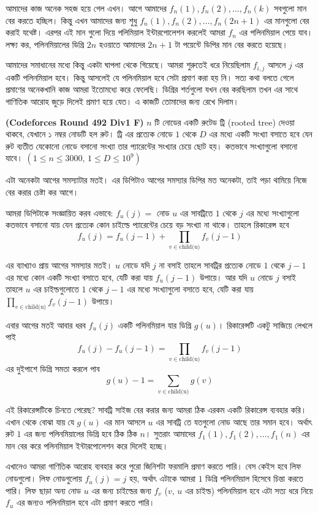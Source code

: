 \begin{solution}
আমাদের কাজ অনেক সহজ হয়ে গেল এখন। আগে আমাদের $f_{n}(1), f_{n}(2), \dots, f_{n}(k)$ সবগুলো মান বের করতে হচ্ছিল। কিন্তু এখন আমাদের জন্য শুধু $f_{n}(1), f_{n}(2), \dots, f_{n}(2n + 1)$ এর মানগুলো বের করাই যথেষ্ট। এরপর এই মান গুলো দিয়ে পলিমিয়াল ইন্টারপোলেশন করলেই আমরা $f_{n}$ এর পলিনমিয়াল পেয়ে যাব। লক্ষ্য কর, পলিনমিয়ালের ডিগ্রি $2n$ হওয়াতে আমাদের $2n + 1$ টা পয়েন্টে ডিপির মান বের করতে হয়েছে। 

আমাদের সমাধানের মধ্যে কিন্তু একটা ঘাপলা থেকে গিয়েছে। আমরা শুরুতেই ধরে নিয়েছিলাম $f_{i, j}$ আসলে $j$ এর একটি পলিনমিয়াল হবে। কিন্তু আসলেই যে পলিনমিয়াল হবে সেটা প্রমাণ করা হয় নি। সত্য কথা বলতে গেলে প্রমাণের অনেকখানি কাজ আমরা ইতোমধ্যে করে ফেলেছি। ডিগ্রির শর্তগুলো যখন বের করছিলাম তখন এর সাথে গাণিতিক আরোহ জুড়ে দিলেই প্রমাণ হয়ে যেত। এ কাজটি তোমাদের জন্য রেখে দিলাম।   
\end{solution}

\begin{problem} \textbf{(Codeforces Round 492 Div1 F)} $n$ টি নোডের একটি রুটেড ট্রি (rooted tree) দেওয়া থাকবে, যেখানে ১ নম্বর নোডটি হল রুট। ট্রি এর প্রত্যেক নোডে $1$ থেকে $D$ এর মধ্যে একটি সংখ্যা বসাতে হবে যেন রুট ব্যতীত যেকোনো নোডে বসানো সংখ্যা তার প্যারেন্টের সংখ্যার চেয়ে ছোট হয়। কতভাবে সংখ্যাগুলো বসানো যাবে। $(1 \leq n \leq 3000, \, 1 \leq D \leq 10^9)$
\end{problem} 
\begin{solution}
এটা অনেকটা আগের সমস্যাটার মতই। এর ডিপিটাও আগের সমস্যার ডিপির মত অনেকটা, তাই পড়া থামিয়ে নিজে বের করার চেষ্টা কর আগে। 

আমরা ডিপিটাকে সংজ্ঞায়িত করব এভাবে: $f_{u}(j) = $ নোড $u$ এর সাবট্রিতে $1$ থেকে $j$ এর মধ্যে সংখ্যাগুলো কতভাবে বসানো যায় যেন প্রত্যেক কোন চাইল্ডে প্যারেন্টের চেয়ে বড় সংখ্যা না থাকে। তাহলে রিকারেন্স হবে 
$$f_{u}(j) = f_{u}(j - 1) + \prod_{v \in \text{child(u)}} f_{v}(j - 1)$$ 

এর ব্যাখ্যাও প্রায় আগের সমস্যার মতই। $u$ নোডে যদি $j$ না বসাই তাহলে সাবট্রির প্রত্যেক নোডে $1$ থেকে $j - 1$ এর মধ্যে কোন একটি সংখ্যা বসাতে হবে, যেটি করা যায় $f_{u}(j - 1)$ উপায়ে। আর যদি $u$ নোডে $j$ বসাই তাহলে $u$ এর চাইল্ডগুলোতে  $1$ থেকে $j - 1$ এর মধ্যে সংখ্যাগুলো বসাতে হবে, যেটি করা যায় $\prod_{v \in \text{child(u)}} f_{v}(j - 1)$ উপায়ে। 

এবার আগের মতই আবার ধরব $f_{u}(j)$ একটি পলিনমিয়াল যার ডিগ্রি $g(u)$। রিকারেন্সটি একটু সাজিয়ে লেখলে পাই 
$$f_{u}(j) - f_{u}(j - 1) = \prod_{v \in \text{child(u)}} f_{v}(j - 1)$$ 
এর দুইপাশে ডিগ্রি সমতা করলে পাব 
$$g(u) - 1 = \sum_{v \in \text{child(u)}} g(v)$$

এই রিকারেন্সটিকে চিনতে পেরেছ? সাবট্রি সাইজ বের করার জন্য আমরা ঠিক এরকম একটি রিকারেন্স ব্যবহার করি। এখান থেকে বোঝা যায় যে $g(u)$ এর মান আসলে $u$ এর সাবট্রি তে যতগুলো নোড আছে তার সমান হবে। অর্থাৎ রুট $1$ এর জন্য পলিনমিয়ালের ডিগ্রি হবে ঠিক ঠিক $n$।  সুতরাং আমাদের $f_{1}(1), f_{1}(2), \dots, f_{1}(n)$ এর মান বের করে পলিনমিয়াল ইন্টারপোলেশন করে দিলেই হচ্ছে। 

এখানেও আমরা গাণিতিক আরোহ ব্যবহার করে পুরো জিনিশটা ফরমালি প্রমাণ করতে পারি। বেস কেইস হবে লিফ নোডগুলো। লিফ নোডগুলোয় $f_{u}(j) = j$ হয়, অর্থাৎ এটাকে আমরা $1$ ডিগ্রি পলিনমিয়াল হিসেবে চিন্তা করতে পারি। লিফ ছাড়া অন্য নোড $u$ এর জন্য চাইল্ডের জন্য $f_{v}$ ($v, \, u$ এর চাইল্ড) পলিনমিয়াল হবে এটা সত্য ধরে নিয়ে $f_{u}$ এর জন্যও পলিনমিয়াল হবে এটা প্রমাণ করতে পারি। 
\end{solution}

